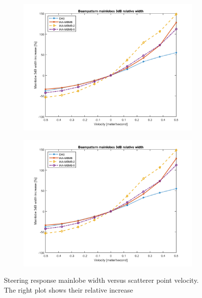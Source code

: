 \begin{figure}[ht]
\begin{subfigure}[t]{0.48\linewidth}
        \includegraphics[width=\linewidth]{./images/discussion/mainlobe_vs_speed_relative.png}
    \end{subfigure}
    \quad
    \begin{subfigure}[t]{0.48\linewidth}
        \includegraphics[width=\linewidth]{./images/discussion/mainlobe_vs_speed_relative.png}
    \end{subfigure}
	\caption{Steering  response  mainlobe  width  versus  scatterer  point velocity. The right plot shows their relative increase}
	\label{fig:mainlobe_vs_speed_upsample}
\end{figure}
\fi

